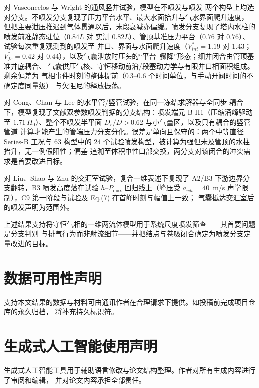\documentclass[preprint,12pt]{elsarticle}
\begin{document}
对 Vasconcelos 与 Wright \cite{vasconcelos2011} 的通风竖井试验，模型在不喷发与喷发
两个构型上均选对分支。不喷发分支复现了压力平台水平、最大水面抬升与气水界面爬升速度，
但把主要泄压推迟到气体贯通以后，末段衰减亦偏缓。喷发分支复现了塔内水柱的喷发前准静态驻位（$0.84L$ 对
实测 $0.82L$）、管顶基准压力平台（$0.76$ 对 $0.76$）、试验每次重复观测到的喷发至
井口、界面与水面爬升速度（$V^{*}_{int}=1.19$ 对 $1.43$；$V^{*}_{fs}=0.42$ 对
$0.44$），以及气囊泄放时压头的``平台--骤降''形态；细井闭合由管顶基准井底耦合、
气囊供压气核、守恒移动前沿/段塞动力学与有限井口相面积组成。剩余偏差为
气相事件时刻的整体提前（$0.3$--$0.6$ 个时间单位，与手动开阀时间的不确定度同量级）
与欠阻尼的释放振荡。

对 Cong、Chan 与 Lee \cite{cong2017} 的水平管/竖管试验，在同一冻结求解器与全同步
耦合下，模型复现了文献双参数喷发判据的分支结构：喷发端元 B-H1（压缩涌峰驱动至
$1.71\,H_0$）、整个不喷发半平面 $D_r/D>0.62$ 与小气量区，以及只有耦合的竖管--管道
计算才能产生的管端压力分支分化。误差是单向且保守的：两个中等直径 Series-B 工况与
63 构型中的 24 个试验喷发构型，被计算为强但未及管顶的水柱抬升，无一例假阳性；偏差
追溯至体积中性口部交换，两分支对该闭合的冲突需求是首要改进目标。

对 Liu、Shao 与 Zhu \cite{liu2020} 的交汇室试验，复合一维表述下复现了 A2/B3
下游边界分支翻转，B3 喷发高度落在试验 $h$--$P_{\max}$ 回归线上（峰压受
$a_{wh}=40$~m/s 声学限制），C9 第一阶段与试验及 Eq.(7) 在首峰时刻与幅值上一致；
气囊抵达交汇室后的喷发声明为范围外。

上述结果支持将守恒气相的一维两流体模型用于系统尺度喷发筛查——其首要问题是分支判别
与排气行为而非射流细节——并把结点与卷吸闭合确定为喷发分支定量改进的目标。

\fi


\section*{数据可用性声明}

支持本文结果的数据与材料可由通讯作者在合理请求下提供。如投稿前完成项目仓库的永久归档，
将补充持久标识符。

\section*{生成式人工智能使用声明}

生成式人工智能工具用于辅助语言修改与论文结构整理。作者对所有生成内容进行了审阅和编辑，
并对论文内容承担全部责任。
\end{document}
